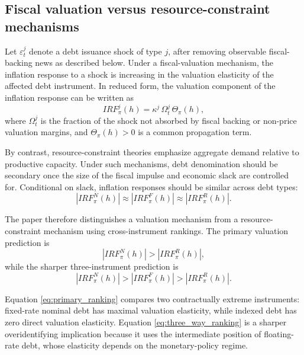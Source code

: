 \documentclass[12pt,a4paper]{article}
\begin{document}
\subsection{Fiscal valuation versus resource-constraint mechanisms}

Let \(\varepsilon_t^j\) denote a debt issuance shock of type \(j\), after removing observable fiscal-backing news as described below. Under a fiscal-valuation mechanism, the inflation response to a shock is increasing in the valuation elasticity of the affected debt instrument. In reduced form, the valuation component of the inflation response can be written as
\begin{equation}
IRF_{\pi}^{j}(h)
=
\kappa^j \, \Omega_t^j \, \Theta_{\pi}(h),
\label{eq:irf_theory_general}
\end{equation}
where \(\Omega_t^j\) is the fraction of the shock not absorbed by fiscal backing or non-price valuation margins, and \(\Theta_{\pi}(h)>0\) is a common propagation term.

By contrast, resource-constraint theories emphasize aggregate demand relative to productive capacity. Under such mechanisms, debt denomination should be secondary once the size of the fiscal impulse and economic slack are controlled for. Conditional on slack, inflation responses should be similar across debt types:
\begin{equation}
|IRF_{\pi}^{N}(h)|
\approx
|IRF_{\pi}^{F}(h)|
\approx
|IRF_{\pi}^{R}(h)|.
\label{eq:resource_restriction}
\end{equation}

The paper therefore distinguishes a valuation mechanism from a resource-constraint mechanism using cross-instrument rankings. The primary valuation prediction is
\begin{equation}
|IRF_{\pi}^{N}(h)|>|IRF_{\pi}^{R}(h)|,
\label{eq:primary_ranking}
\end{equation}
while the sharper three-instrument prediction is
\begin{equation}
|IRF_{\pi}^{N}(h)|>|IRF_{\pi}^{F}(h)|>|IRF_{\pi}^{R}(h)|.
\label{eq:three_way_ranking}
\end{equation}

Equation \eqref{eq:primary_ranking} compares two contractually extreme instruments: fixed-rate nominal debt has maximal valuation elasticity, while indexed debt has zero direct valuation elasticity. Equation \eqref{eq:three_way_ranking} is a sharper overidentifying implication because it uses the intermediate position of floating-rate debt, whose elasticity depends on the monetary-policy regime.
\end{document}
